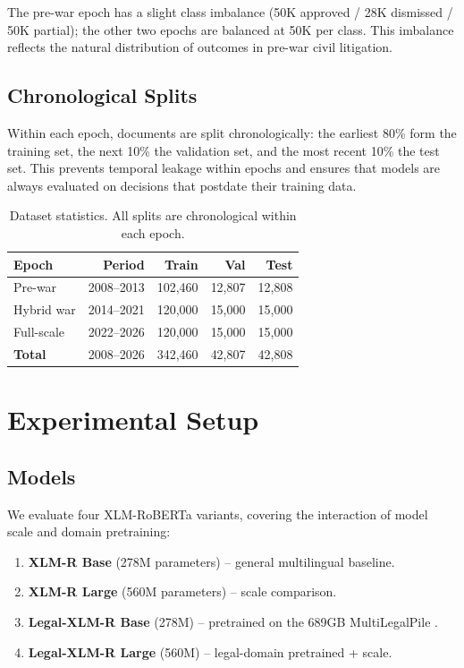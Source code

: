 \documentclass[11pt]{article}
\begin{document}
The pre-war epoch has a slight class imbalance (50K approved / 28K dismissed / 50K partial); the other two epochs are balanced at 50K per class. This imbalance reflects the natural distribution of outcomes in pre-war civil litigation.

\subsection{Chronological Splits}

Within each epoch, documents are split chronologically: the earliest 80\% form the training set, the next 10\% the validation set, and the most recent 10\% the test set. This prevents temporal leakage within epochs and ensures that models are always evaluated on decisions that postdate their training data.

\begin{table}[t]
\centering
\small
\caption{Dataset statistics. All splits are chronological within each epoch.}
\label{tab:dataset}
\begin{tabular}{lrrrr}
\toprule
\textbf{Epoch} & \textbf{Period} & \textbf{Train} & \textbf{Val} & \textbf{Test} \\
\midrule
Pre-war      & 2008--2013 & 102,460 & 12,807 & 12,808 \\
Hybrid war   & 2014--2021 & 120,000 & 15,000 & 15,000 \\
Full-scale   & 2022--2026 & 120,000 & 15,000 & 15,000 \\
\midrule
\textbf{Total} & 2008--2026 & 342,460 & 42,807 & 42,808 \\
\bottomrule
\end{tabular}
\end{table}

\section{Experimental Setup}

\subsection{Models}

We evaluate four XLM-RoBERTa \citep{conneau2020xlmr} variants, covering the interaction of model scale and domain pretraining:

\begin{enumerate}[nosep]
  \item \textbf{XLM-R Base} (278M parameters) -- general multilingual baseline.
  \item \textbf{XLM-R Large} (560M parameters) -- scale comparison.
  \item \textbf{Legal-XLM-R Base} (278M) -- pretrained on the 689GB MultiLegalPile \citep{niklaus2023multilegalpile}.
  \item \textbf{Legal-XLM-R Large} (560M) -- legal-domain pretrained + scale.
\end{enumerate}
\end{document}

